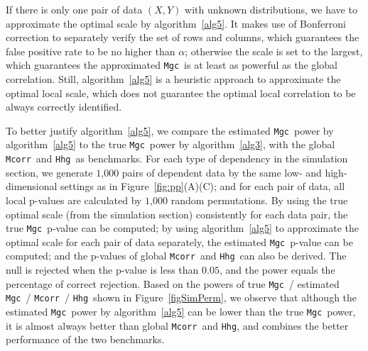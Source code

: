 \documentclass[11pt]{article}
\providecommand{\sct}[1]{{\sc \texttt{#1}}}
\newcommand{\Mgc}{\sct{Mgc}}
\newcommand{\Hhg}{\sct{Hhg}}
\newcommand{\Mcorr}{\sct{Mcorr}}
\begin{document}
If there is only one pair of data $(X,Y)$ with unknown distributions, we have to approximate the optimal scale by algorithm~\ref{alg5}. It makes use of Bonferroni correction to separately verify the set of rows and columns, which guarantees the false positive rate to be no higher than $\alpha$; otherwise the scale is set to the largest, which guarantees the approximated \Mgc~is at least as powerful as the global correlation. Still, algorithm~\ref{alg5} is a heuristic approach to approximate the optimal local scale, which does not guarantee the optimal local correlation to be always correctly identified.


To better justify algorithm~\ref{alg5}, we compare the estimated \Mgc~power by algorithm~\ref{alg5} to the true \Mgc~power by algorithm~\ref{alg3}, with the global \Mcorr~and \Hhg~as benchmarks. For each type of dependency in the simulation section, we generate $1$,$000$ pairs of dependent data by the same low- and high-dimensional settings as in Figure~\ref{fig:pp}(A)(C); and for each pair of data, all local p-values are calculated by $1$,$000$ random permutations. By using the true optimal scale (from the simulation section) consistently for each data pair, the true \Mgc~p-value can be computed; by using algorithm~\ref{alg5} to approximate the optimal scale for each pair of data separately, the estimated \Mgc~p-value can be computed; and the p-values of global \Mcorr~and \Hhg~can also be derived. The null is rejected when the p-value is less than $0.05$, and the power equals the percentage of correct rejection. Based on the powers of true \Mgc~/ estimated \Mgc~/ \Mcorr~/ \Hhg~shown in Figure~\ref{figSimPerm}, we observe that although the estimated \Mgc~power by algorithm~\ref{alg5} can be lower than the true \Mgc~power, it is almost always better than global \Mcorr~and \Hhg, and combines the better performance of the two benchmarks. 
\end{document}
